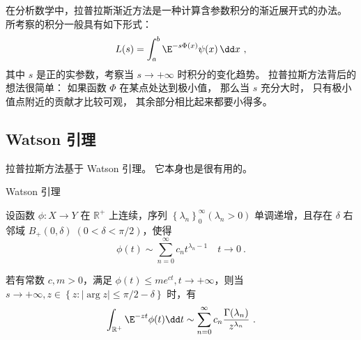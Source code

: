 

在分析数学中，拉普拉斯渐近方法是一种计算含参数积分的渐近展开式的办法。 所考察的积分一般具有如下形式：
\begin{equation}\label{eq_LapAsm_1}
L(s)=\int_a^b\E^{-s\Phi(x)}\psi(x)\,\dd x~,
\end{equation}
其中 $s$ 是正的实参数，考察当 $s\to+\infty$ 时积分的变化趋势。 拉普拉斯方法背后的想法很简单： 如果函数 $\Phi$ 在某点处达到极小值， 那么当 $s$ 充分大时， 只有极小值点附近的贡献才比较可观， 其余部分相比起来都要小得多。

\subsection{Watson 引理}
拉普拉斯方法基于 Watson 引理。 它本身也是很有用的。

\begin{lemma}{Watson 引理}

设函数 $\phi:X\to Y$ 在 $\mathbb{R}^+$ 上连续，序列 $\left\{\lambda_n\right\}_0^\infty\left(\lambda_n>0\right)$ 单调递增，且存在 $\delta$ 右邻域 $B_{+}(0,\delta)\;(0<\delta<\pi/2)$，使得
\begin{equation}\label{eq_LapAsm_2}
  \phi\left(t\right)\sim\sum_{n=0}^{\infty}{c_nt^{\lambda_n-1}}\quad t\to0~.
\end{equation}

若有常数 $c,m>0$，满足 $\phi\left(t\right) \le me^{ct},t\to+\infty$，则当 $s\to+\infty,z\in{\left\{z:\left|\arg{z}\right|\le\pi/2-\delta\right\}}$ 时，有
\begin{equation}\label{eq_LapAsm_3}
\int_{\mathbb{R}^+}\E^{-zt}\phi(t)\dd t\sim\sum_{n=0}^{\infty}{c_n}\frac{\Gamma(\lambda_n)}{z^{\lambda_n}}  ~.
\end{equation}
\end{lemma}

